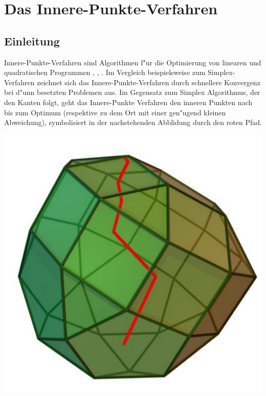 %
%
 
%

\chapter{Das Innere-Punkte-Verfahren}

\begin{refsection}

\section{Einleitung}
Innere-Punkte-Verfahren sind Algorithmen f"ur die Optimierung von linearen
und quadratischen Programmen \cite{ip:wiki}, \cite{ip:tunc}, \cite{ip:werner}.
Im Vergleich beispielsweise zum Simplex-Verfahren
zeichnet sich das Innere-Punkte-Verfahren durch schnellere Konvergenz
bei d"unn besetzten Problemen aus. Im Gegensatz zum Simplex Algorithmus, der
den Kanten folgt, geht das Innere-Punkte Verfahren den
inneren Punkten nach bis zum Optimum (respektive zu dem Ort mit einer
gen"ugend kleinen Abweichung), symbolisiert in der nachstehenden Abblidung
durch den roten Pfad.
\begin{center}
  \includegraphics[scale=0.3]{innerepunkte/Interior-point-method-three-dimensions.pdf}
\end{center}
	

\end{refsection}
